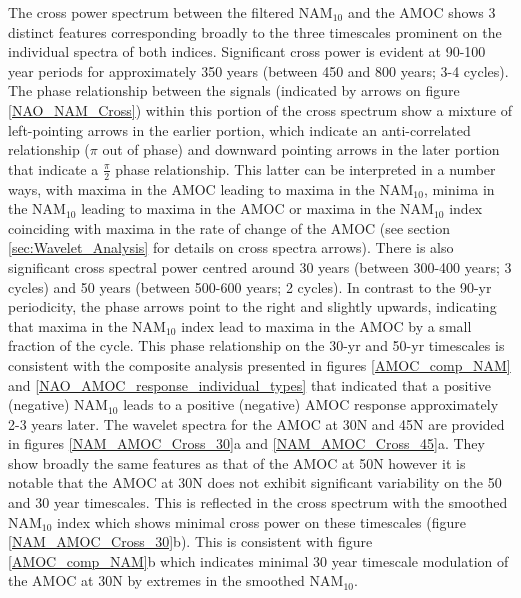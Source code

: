 The cross power spectrum between the filtered NAM$_{10}$ and the AMOC shows 3 distinct features corresponding broadly to the three timescales prominent on the individual spectra of both indices. Significant cross power is evident at 90-100 year periods for approximately 350 years (between 450 and 800 years; 3-4 cycles). The phase relationship between the signals (indicated by arrows on figure \ref{NAO_NAM_Cross}) within this portion of the cross spectrum  show a mixture of left-pointing arrows in the earlier portion, which indicate an anti-correlated relationship  ($\pi$ out of phase) and downward pointing arrows in the later portion that indicate a $\frac{\pi}{2}$ phase relationship. This latter can be interpreted in a number ways, with maxima in the AMOC leading to maxima in the NAM$_{10}$, minima in the NAM$_{10}$ leading to maxima in the AMOC or maxima in the NAM$_{10}$ index coinciding with maxima in the rate of change of the AMOC (see section \ref{sec:Wavelet_Analysis} for details on cross spectra arrows). There is also significant cross spectral power centred around 30 years (between 300-400 years; 3 cycles) and 50 years (between 500-600 years; 2 cycles). In contrast to the 90-yr periodicity, the phase arrows point to the right and slightly upwards, indicating that maxima in the NAM$_{10}$ index lead to maxima in the AMOC by a small fraction of the cycle. This phase relationship on the 30-yr and 50-yr timescales is consistent with the composite analysis presented in figures \ref{AMOC_comp_NAM} and \ref{NAO_AMOC_response_individual_types} that indicated that a positive (negative) NAM$_{10}$ leads to a positive (negative) AMOC response approximately 2-3 years later. The wavelet spectra for the AMOC at 30N and 45N are provided in figures \ref{NAM_AMOC_Cross_30}a and \ref{NAM_AMOC_Cross_45}a. They show broadly the same features as that of the AMOC at 50N however it is notable that the AMOC at 30N does not exhibit significant variability on the 50 and 30 year timescales. This is reflected in the cross spectrum with the smoothed NAM$_{10}$ index which shows minimal cross power on these timescales (figure \ref{NAM_AMOC_Cross_30}b). This is consistent with figure \ref{AMOC_comp_NAM}b which indicates minimal 30 year timescale modulation of the AMOC at 30N by extremes in the smoothed NAM$_{10}$.

